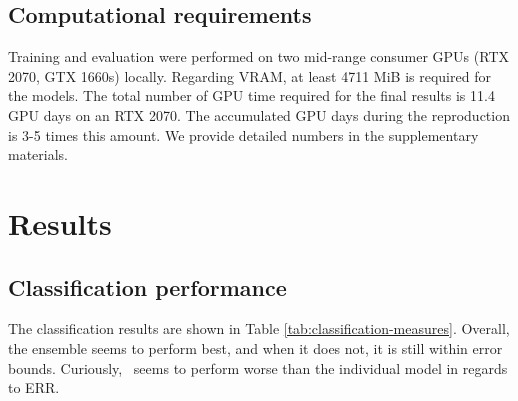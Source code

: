 \subsection{Computational requirements}
Training and evaluation were performed on two mid-range consumer GPUs (RTX 2070, GTX 1660s) locally. Regarding VRAM, at least 4711 MiB is required for the models. The total number of GPU time required for the final results is 11.4 GPU days on an RTX 2070. The accumulated GPU days during the reproduction is 3-5 times this amount. We provide detailed numbers in the supplementary materials. 
\section{Results}

\subsection{Classification performance}

The classification results are shown in Table \ref{tab:classification-measures}. Overall, the ensemble seems to perform best, and when it does not, it is still within error bounds. Curiously, \EnDDaux \ seems to perform worse than the individual model in regards to ERR. 

